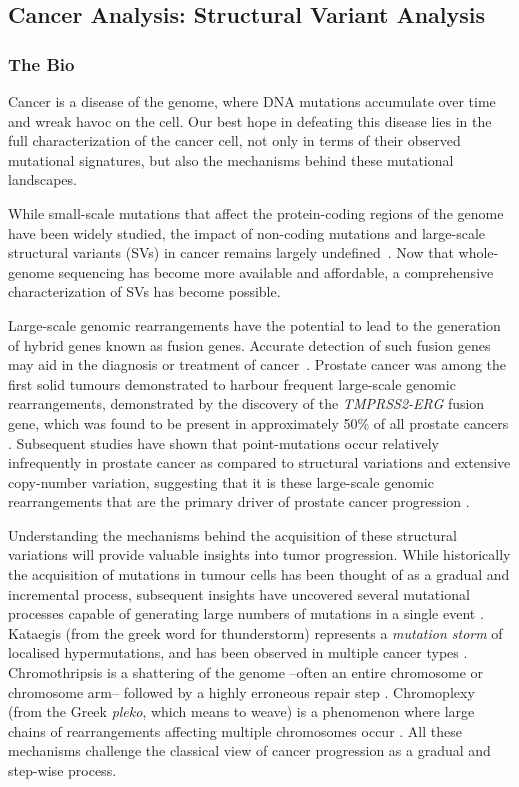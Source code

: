 \subsection{Cancer Analysis: Structural Variant Analysis}
\subsubsection{The Bio}

Cancer is a disease of the genome, where DNA mutations accumulate over time and wreak havoc on the cell. Our best hope in defeating this disease lies in the full characterization of the cancer cell, not only in terms of their observed mutational signatures, but also the mechanisms behind these mutational landscapes.

While small-scale mutations that affect the protein-coding regions of the genome have been widely studied, the impact of non-coding mutations and large-scale structural variants (SVs) in cancer remains largely undefined~\cite{cuykendall2017non,khurana2016role}. Now that whole-genome sequencing has become more available and affordable, a comprehensive characterization of SVs has become possible.

Large-scale genomic rearrangements have the potential to lead to the generation of hybrid genes known as fusion genes.
Accurate detection of such fusion genes may aid in the diagnosis or treatment of cancer~\cite{nowell1960chromosome,nowell1961chromosome,druker2001activity,druker2001efficacy}.
Prostate cancer was among the first solid tumours demonstrated to harbour frequent large-scale genomic rearrangements, demonstrated by the discovery of the \emph{TMPRSS2-ERG} fusion gene, which was found to be present in approximately 50\% of all prostate cancers \cite{tomlins2005recurrent}.
Subsequent studies have shown that point-mutations occur relatively infrequently in prostate cancer as compared to structural variations and extensive copy-number variation, suggesting that it is these large-scale genomic rearrangements that are the primary driver of prostate cancer progression \cite{taylor2010integrative,rubin2011common}.

Understanding the mechanisms behind the acquisition of these structural variations will provide valuable insights into tumor progression.
While historically the acquisition of mutations in tumour cells has been thought of as a gradual and incremental process, subsequent insights have uncovered several mutational processes capable of generating large numbers of mutations in a single event \cite{cortes2020comprehensive,willis2015}.
Kataegis (from the greek word for thunderstorm) represents a \emph{mutation storm} of localised hypermutations, and has been observed in multiple cancer types \cite{nik2012mutational,davis2014somatic}.
Chromothripsis is a shattering of the genome --often an entire chromosome or chromosome arm-- followed by a highly erroneous repair step \cite{stephens2011massive,maher2012chromothripsis}.
Chromoplexy (from the Greek \emph{pleko}, which means to weave) is a phenomenon where large chains of rearrangements affecting multiple chromosomes occur \cite{shen2013chromoplexy}. All these mechanisms challenge the classical view of cancer progression as a gradual and step-wise process.

